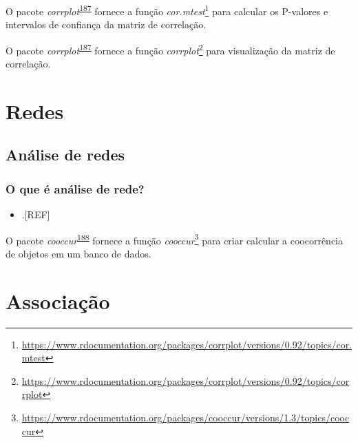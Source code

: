 \documentclass[
  a4paper,
]{book}
\providecommand{\tightlist}{%
  \setlength{\itemsep}{0pt}\setlength{\parskip}{0pt}}
\renewcommand{\href}[2]{#2\footnote{\url{#1}}}
\newenvironment{infobox}[1]
  {
  \begin{itemize}
  \renewcommand{\labelitemi}{
    \raisebox{-.7\height}[0pt][0pt]{
      {\setkeys{Gin}{width=3em,keepaspectratio}
        \texttt{[image: \#1]}}
    }
  }
  \setlength{\fboxsep}{1em}
  \begin{blackbox}
  \item
  }
  {
  \end{blackbox}
  \end{itemize}
  }
\begin{document}
\begin{infobox}{images/Rlogo}
O pacote \emph{corrplot}\textsuperscript{\protect\hyperlink{ref-corrplot-2}{187}} fornece a função \href{https://www.rdocumentation.org/packages/corrplot/versions/0.92/topics/cor.mtest}{\emph{cor.mtest}} para calcular os P-valores e intervalos de confiança da matriz de correlação.

\end{infobox}

\begin{infobox}{images/Rlogo}
O pacote \emph{corrplot}\textsuperscript{\protect\hyperlink{ref-corrplot-2}{187}} fornece a função \href{https://www.rdocumentation.org/packages/corrplot/versions/0.92/topics/corrplot}{\emph{corrplot}} para visualização da matriz de correlação.

\end{infobox}

\hypertarget{analise-redes}{%
\chapter{\texorpdfstring{\textbf{Redes}}{Redes}}\label{analise-redes}}

\hypertarget{redes}{%
\section{Análise de redes}\label{redes}}

\hypertarget{o-que-uxe9-anuxe1lise-de-rede}{%
\subsection{O que é análise de rede?}\label{o-que-uxe9-anuxe1lise-de-rede}}

\begin{itemize}
\tightlist
\item
  .{[}REF{]}
\end{itemize}

\begin{infobox}{images/Rlogo}
O pacote \emph{cooccur}\textsuperscript{\protect\hyperlink{ref-cooccur}{188}} fornece a função \href{https://www.rdocumentation.org/packages/cooccur/versions/1.3/topics/cooccur}{\emph{cooccur}} para criar calcular a coocorrência de objetos em um banco de dados.

\end{infobox}

\hypertarget{analise-inferencial-associacao}{%
\chapter{\texorpdfstring{\textbf{Associação}}{Associação}}\label{analise-inferencial-associacao}}
\end{document}
